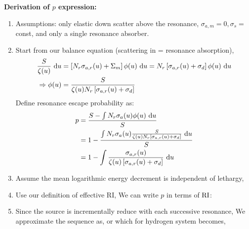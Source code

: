 \documentclass{school-22.211-notes}
\begin{document}
\textbf{Derivation of $p$ expression:}
\begin{enumerate}
\item Assumptions: only elastic down scatter above the resonance, $\sigma_{a,m} = 0, \sigma_{s} = $const, and only a single resonance absorber. 
\item Start from our balance equation (scattering in = resonance absorption),
\begin{align}
\frac{S}{\zeta(u)} \mbox{ }\mathrm{d} u &= \left[ N_r \sigma_{a,r} (u) + \Sigma_m \right] \phi(u) \mbox{ }\mathrm{d} u = N_r \left[ \sigma_{a,r} (u) + \sigma_d \right] \phi(u) \mbox{ }\mathrm{d} u \\
\Rightarrow \phi(u) &= \frac{S}{\zeta(u) N_r \left[ \sigma_{a,r} (u) + \sigma_d \right] } 
\end{align}
Define resonance escape probability as:
\begin{align}
p &= \frac{S - \int N_r \sigma_a(u) \phi(u) \mbox{ }\mathrm{d} u}{S} \\
&= 1 - \frac{\int N_r \sigma_a(u) \frac{S}{\zeta(u) N_r \left[ \sigma_{a,r} (u) + \sigma_d \right] } \mbox{ }\mathrm{d} u }{S} \\
&= 1 - \int \frac{\sigma_{a,r} (u) }{\zeta(u) \left[ \sigma_{a,r} (u) + \sigma_d \right] } \mbox{ }\mathrm{d} u
\end{align}
\item Assume the mean logarithmic energy decrement is independent of lethargy, 
\item Use our definition of effective RI,
We can write $p$ in terms of $\mathrm{RI}$:
\item Since the source is incrementally reduce with each successive resonance,
We approximate the sequence as,
or
which for hydrogen system becomes, 
\end{enumerate}
\end{document}
